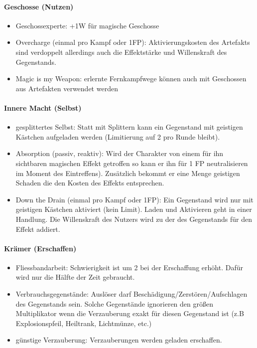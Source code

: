 \documentclass{article}
\begin{document}
\paragraph{Geschosse (Nutzen)}

\begin{itemize}
\item Geschossexperte: +1W für magische Geschosse
\item Overcharge (einmal pro Kampf oder 1FP): Aktivierungskosten des Artefakts sind verdoppelt allerdings auch die Effektstärke und Willenskraft des Gegenstands.
\item Magic is my Weapon: erlernte Fernkampfwege können auch mit Geschossen aus Artefakten verwendet werden
\end{itemize}

\paragraph{Innere Macht (Selbst)}

\begin{itemize}
\item gesplittertes Selbst: Statt mit Splittern kann ein Gegenstand mit geistigen Kästchen aufgeladen werden (Limitierung auf 2 pro Runde bleibt).
\item Absorption (passiv, reaktiv): Wird der Charakter von einem für ihn sichtbaren magischen Effekt getroffen so kann er ihn für 1 FP neutralisieren im Moment des Eintreffens). Zusätzlich bekommt er eine Menge geistigen Schaden die den Kosten des Effekts entsprechen.
\item Down the Drain (einmal pro Kampf oder 1FP): Ein Gegenstand wird nur mit geistigen Kästchen aktiviert (kein Limit). Laden und Aktivieren geht in einer Handlung. Die Willenskraft des Nutzers wird zu der des Gegenstands für den Effekt addiert.
\end{itemize}

\paragraph{Krämer (Erschaffen)}

\begin{itemize}
\item Fliessbandarbeit: Schwierigkeit ist um 2 bei der Erschaffung erhöht. Dafür wird nur die Hälfte der Zeit gebraucht.
\item Verbrauchsgegenstände: Auslöser darf Beschädigung/Zerstören/Aufschlagen des Gegenstands sein. Solche Gegenstände ignorieren den größen Multiplikator wenn die Verzauberung exakt für diesen Gegenstand ist (z.B Explosionspfeil, Heiltrank, Lichtmünze, etc.)
\item günstige Verzauberung: Verzauberungen werden geladen erschaffen.
\end{itemize}
\end{document}
